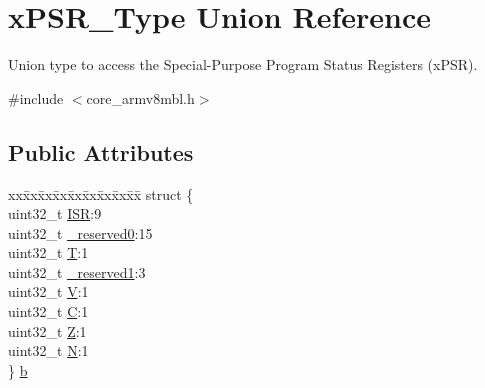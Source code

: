 \hypertarget{unionx_p_s_r___type}{}\section{x\+P\+S\+R\+\_\+\+Type Union Reference}
\label{unionx_p_s_r___type}


Union type to access the Special-\/\+Purpose Program Status Registers (x\+P\+SR).  




{\ttfamily \#include $<$core\+\_\+armv8mbl.\+h$>$}

\subsection*{Public Attributes}
\begin{DoxyCompactItemize}
\item 
\begin{tabbing}
xx\=xx\=xx\=xx\=xx\=xx\=xx\=xx\=xx\=\kill
struct \{\\
\>uint32\_t \hyperlink{unionx_p_s_r___type_a3e9120dcf1a829fc8d2302b4d0673970}{ISR}:9\\
\>uint32\_t \hyperlink{unionx_p_s_r___type_af438e0f407357e914a70b5bd4d6a97c5}{\_reserved0}:15\\
\>uint32\_t \hyperlink{unionx_p_s_r___type_a7eed9fe24ae8d354cd76ae1c1110a658}{T}:1\\
\>uint32\_t \hyperlink{unionx_p_s_r___type_a790056bb6f20ea16cecc784b0dd19ad6}{\_reserved1}:3\\
\>uint32\_t \hyperlink{unionx_p_s_r___type_af14df16ea0690070c45b95f2116b7a0a}{V}:1\\
\>uint32\_t \hyperlink{unionx_p_s_r___type_a40213a6b5620410cac83b0d89564609d}{C}:1\\
\>uint32\_t \hyperlink{unionx_p_s_r___type_a1e5d9801013d5146f2e02d9b7b3da562}{Z}:1\\
\>uint32\_t \hyperlink{unionx_p_s_r___type_a2db9a52f6d42809627d1a7a607c5dbc5}{N}:1\\
\} \hyperlink{unionx_p_s_r___type_a3b1063bb5cdad67e037cba993b693b70}{b}\\


\end{tabbing}
\end{DoxyCompactItemize}
